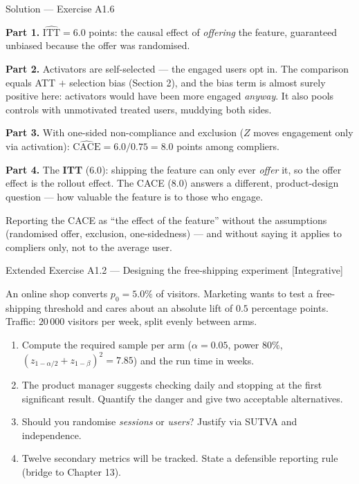 \documentclass[aspectratio=169,11pt]{beamer}
\begin{document}
\begin{frame}{Solution --- Exercise A1.6}
\begin{solutionbox}
  \textbf{Part 1.} $\widehat{\mathrm{ITT}} = 6.0$ points: the causal effect of
  \emph{offering} the feature, guaranteed unbiased because the offer was randomised.

  \smallskip
  \textbf{Part 2.} Activators are self-selected --- the engaged users opt in. The
  comparison equals ATT $+$ selection bias (Section 2), and the bias term is almost
  surely positive here: activators would have been more engaged \emph{anyway}. It also
  pools controls with unmotivated treated users, muddying both sides.

  \smallskip
  \textbf{Part 3.} With one-sided non-compliance and exclusion ($Z$ moves engagement
  only via activation): $\widehat{\mathrm{CACE}} = 6.0/0.75 = \mathbf{8.0}$ points among
  compliers.

  \smallskip
  \textbf{Part 4.} The \textbf{ITT} ($6.0$): shipping the feature can only ever
  \emph{offer} it, so the offer effect is the rollout effect. The CACE ($8.0$) answers a
  different, product-design question --- how valuable the feature is to those who engage.
\end{solutionbox}
\begin{mistake}
  Reporting the CACE as ``the effect of the feature'' without the assumptions
  (randomised offer, exclusion, one-sidedness) --- and without saying it applies to
  compliers only, not to the average user.
\end{mistake}
\end{frame}

\begin{frame}{Extended Exercise A1.2 --- Designing the free-shipping experiment [Integrative]}
\begin{longexercise}
  An online shop converts $p_0 = 5.0\%$ of visitors. Marketing wants to test a
  free-shipping threshold and cares about an absolute lift of $0.5$ percentage points.
  Traffic: $20\,000$ visitors per week, split evenly between arms.
  \begin{enumerate}
    \item Compute the required sample per arm ($\alpha=0.05$, power $80\%$,
          $(z_{1-\alpha/2}+z_{1-\beta})^2=7.85$) and the run time in weeks.
    \item The product manager suggests checking daily and stopping at the first
          significant result. Quantify the danger and give two acceptable alternatives.
    \item Should you randomise \emph{sessions} or \emph{users}? Justify via SUTVA and
          independence.
    \item Twelve secondary metrics will be tracked. State a defensible reporting rule
          (bridge to Chapter 13).
  \end{enumerate}
\end{longexercise}
\end{frame}
\end{document}
